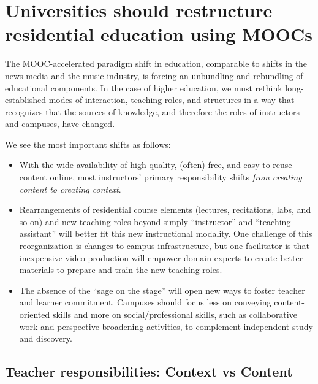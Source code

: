 \section{Universities should restructure residential education using MOOCs}



The MOOC-accelerated paradigm shift in education, comparable to shifts
in the news media and the music industry,
is forcing an unbundling and rebundling of educational components. In the
case of higher education, 
we must rethink long-established modes of interaction, teaching roles,
and structures in a way that recognizes
that the sources of knowledge, and therefore the roles of instructors and
campuses, have changed.

We see the most important shifts as follows:

\begin{itemize}

\item With the wide availability of high-quality, (often) free, and
easy-to-reuse content online, most instructors' primary responsibility
shifts \emph{from creating content to creating context}.

\item Rearrangements of residential course elements (lectures,
  recitations, labs, and so on) and new teaching roles beyond simply ``instructor''
  and ``teaching assistant'' will better fit this new instructional
  modality.  One challenge of this reorganization is changes to campus
  infrastructure, but one facilitator is that inexpensive video production
  will empower domain experts to create 
  better materials to prepare and train the new teaching roles.

\item The absence of the ``sage on the stage'' will open new ways to
foster teacher and learner commitment.  Campuses should
focus less on conveying content-oriented skills and more on
social/professional skills, such as collaborative work and
perspective-broadening activities, to complement  independent study
and discovery.

\end{itemize} 

\subsection{Teacher responsibilities: Context vs Content}

